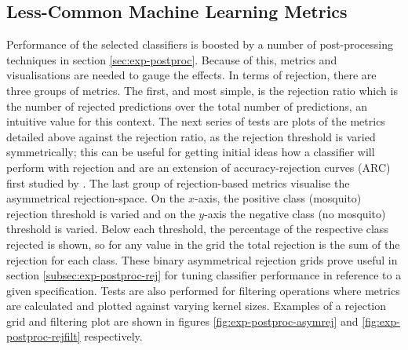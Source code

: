     \subsection{Less-Common Machine Learning Metrics}
    \label{subsec:pl-test-less}
        Performance of the selected classifiers is boosted by a number of post-processing techniques in section \ref{sec:exp-postproc}. Because of this, metrics and visualisations are needed to gauge the effects. In terms of rejection, there are three groups of metrics. The first, and most simple, is the rejection ratio which is the number of rejected predictions over the total number of predictions, an intuitive value for this context. The next series of tests are plots of the metrics detailed above against the rejection ratio, as the rejection threshold is varied symmetrically; this can be useful for getting initial ideas how a classifier will perform with rejection and are an extension of accuracy-rejection curves (ARC) first studied by \textcite{SajjadAhmedNadeem}. The last group of rejection-based metrics visualise the asymmetrical rejection-space. On the $x$-axis, the positive class (mosquito) rejection threshold is varied and on the $y$-axis the negative class (no mosquito) threshold is varied. Below each threshold, the percentage of the respective class rejected is shown, so for any value in the grid the total rejection is the sum of the rejection for each class. These binary asymmetrical rejection grids prove useful in section \ref{subsec:exp-postproc-rej} for tuning classifier performance in reference to a given specification. Tests are also performed for filtering operations where metrics are calculated and plotted against varying kernel sizes. Examples of a rejection grid and filtering plot are shown in figures \ref{fig:exp-postproc-asymrej} and \ref{fig:exp-postproc-rejfilt} respectively.
    
